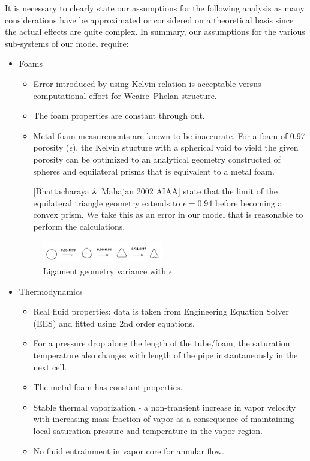 \documentclass[compileTAMUreport.tex]{subfiles}
\begin{document}
It is necessary to clearly state our assumptions for the following analysis as many considerations have be approximated or considered on a theoretical basis since the actual effects are quite complex. 
In summary, our assumptions for the various sub-systems of our model require:
\begin{itemize} %
	\item Foams
		\begin{itemize}
			\item 	Error introduced by using Kelvin relation is acceptable versus computational effort for Weaire–Phelan structure. \cite{Kusner1996}
			\item The foam properties are constant through out.
			\item	Metal foam measurements are known to be inaccurate. 
			For a foam of 0.97 porosity ($\epsilon$), the Kelvin stucture with a spherical void to yield the given porosity can be optimized to an analytical geometry constructed of spheres and equilateral prisms that is equivalent to a metal foam.
			 
			[Bhattacharaya 		\& Mahajan 2002 AIAA] state that the limit of the equilateral triangle geometry extends to $\epsilon = 0.94$ before becoming a convex prism. 
			We take this as an error in our model that is reasonable to perform the calculations.\cite{Bhattacharya2002}
		\end{itemize}
		
\begin{figure}[H]
  \centering
    \includegraphics[width=0.5\textwidth]{./figure/porosityVariance}
  \caption{Ligament geometry variance with $\epsilon$}
\end{figure}

	\item Thermodynamics
		\begin{itemize}
			\item 	Real fluid properties: data is taken from Engineering Equation Solver (EES) and fitted using 2nd order equations. 
			\item 	For a pressure drop along the length of the tube/foam, the saturation temperature also changes with length of the pipe instantaneously in the next cell.
			\item The metal foam has constant properties.
			\item 	Stable thermal vaporization - a non-transient increase in vapor velocity with increasing mass fraction of vapor as a consequence of maintaining local saturation pressure and temperature in the vapor region.
		\item 	No fluid entrainment in vapor core for annular flow.
		\end{itemize}


\end{itemize}
\end{document}
